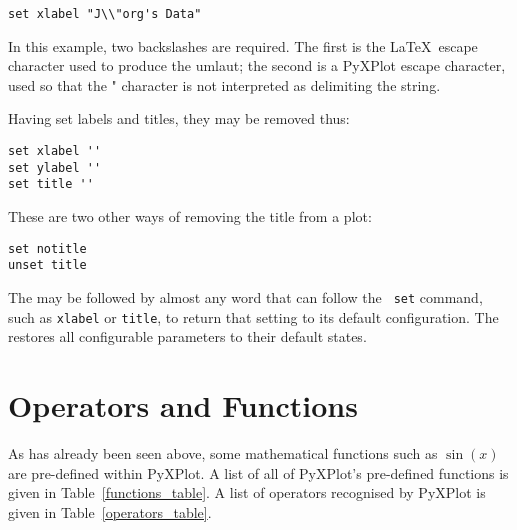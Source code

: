 \begin{verbatim}
set xlabel "J\\"org's Data"
\end{verbatim}

\noindent In this example, two backslashes are required.  The first is the
\LaTeX\ escape character used to produce the umlaut; the second is a PyXPlot
escape character, used so that the " character is not interpreted as
delimiting the string. 

Having set labels and titles, they may be removed thus:

\begin{verbatim}
set xlabel ''
set ylabel ''
set title ''
\end{verbatim}

\noindent These are two other ways of removing the title from a plot:

\begin{verbatim}
set notitle
unset title
\end{verbatim}

The  may be followed by almost any word that can follow the {\tt
set} command, such as {\tt xlabel} or {\tt title}, to return that setting to
its default configuration. The  restores all configurable
parameters to their default states.

\section{Operators and Functions}

As has already been seen above, some mathematical functions such as $\sin(x)$
are pre-defined within PyXPlot. A list of all of PyXPlot's pre-defined
functions is given in Table~\ref{functions_table}. A list of operators
recognised by PyXPlot is given in
Table~\ref{operators_table}.

